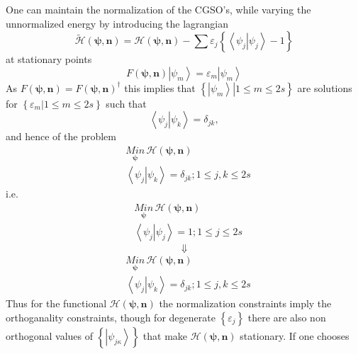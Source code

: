 \documentclass[aps,preprint]{revtex4}%
\begin{document}
One can maintain the normalization of the CGSO's, while varying the
unnormalized energy by introducing the lagrangian
\begin{equation}
\mathcal{\tilde{H}}\left(  \mathbf{\psi,n}\right)  =\mathcal{H}\left(
\mathbf{\psi,n}\right)  -\sum\varepsilon_{j}\left\{  \left\langle \left.
\psi_{j}\right\vert \psi_{j}\right\rangle -1\right\}
\end{equation}
at stationary points
\begin{equation}
F\left(  \mathbf{\psi,n}\right)  \left\vert \psi_{m}\right\rangle
=\varepsilon_{m}\left\vert \psi_{m}\right\rangle
\end{equation}
As $F\left(  \mathbf{\psi,n}\right)  =F\left(  \mathbf{\psi,n}\right)
^{\dagger}$ this implies that $\left\{  \left.  \left\vert \psi_{m}%
\right\rangle \right\vert 1\leq m\leq2s\right\}  $ are solutions for $\left\{
\left.  \varepsilon_{m}\right\vert 1\leq m\leq2s\right\}  $ such that
\begin{equation}
\left\langle \left.  \psi_{j}\right\vert \psi_{k}\right\rangle =\delta_{jk},
\end{equation}
and hence of the problem
\begin{align}
&  \underset{\mathbf{\psi}}{Min}\,\mathcal{H}\left(  \mathbf{\psi,n}\right)
\\
&  \left\langle \left.  \psi_{j}\right\vert \psi_{k}\right\rangle =\delta
_{jk};1\leq j,k\leq2s
\end{align}
i.e.
\begin{align}
&  \underset{\mathbf{\psi}}{Min}\,\mathcal{H}\left(  \mathbf{\psi,n}\right)
\\
&  \left\langle \left.  \psi_{j}\right\vert \psi_{j}\right\rangle =1;1\leq
j\leq2s
\end{align}%
\begin{equation}
\Downarrow
\end{equation}%
\begin{align}
&  \underset{\mathbf{\psi}}{Min}\,\mathcal{H}\left(  \mathbf{\psi,n}\right)
\\
&  \left\langle \left.  \psi_{j}\right\vert \psi_{k}\right\rangle =\delta
_{jk};1\leq j,k\leq2s
\end{align}
Thus for the functional $\mathcal{H}\left(  \mathbf{\psi,n}\right)  $ the
normalization constraints imply the orthoganality constraints, though for
degenerate $\left\{  \varepsilon_{j}\right\}  $ there are also non orthogonal
values of $\left\{  \left\vert \psi_{j\kappa}\right\rangle \right\}  $ that
make $\mathcal{H}\left(  \mathbf{\psi,n}\right)  $ stationary. If one chooses
\end{document}
